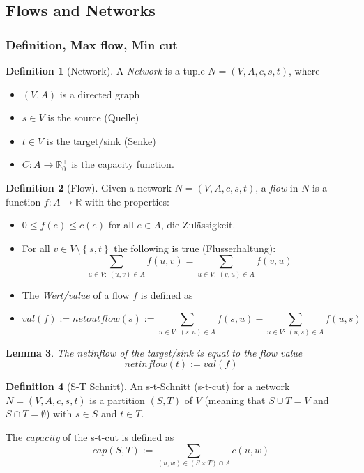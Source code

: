 \documentclass[12pt]{extarticle}
\theoremstyle{definition}
\newtheorem{definition}{Definition}[section]
\theoremstyle{remark}
\theoremstyle{plain}
\theoremstyle{plain}
\newtheorem{lemma}[definition]{Lemma}
\theoremstyle{plain}
\begin{document}
\subsection{Flows and Networks}


\subsubsection{Definition, Max flow, Min cut}
\begin{definition}[Network]
    A \textit{Network} is a tuple $N = (V, A, c, s, t)$, where
    \begin{itemize}
        \item $(V, A)$ is a directed graph
        \item $s \in V$ is the source (Quelle)
        \item $t \in V$ is the target/sink (Senke)
        \item $C: A \to \mathbb{R}^+_0$ is the capacity function.
    \end{itemize}
\end{definition}

\begin{definition}[Flow]
    Given a network $N = (V, A, c, s, t)$, a \textit{flow} in $N$ is a function $f: A \to \mathbb{R}$ with the
    properties:
    \begin{itemize}
        \item $0 \le f(e) \le c(e)$ for all $e \in A$, die Zulässigkeit.
        \item For all $v \in V \setminus \left\{ s, t \right\}$ the following is true (Flusserhaltung):
              \[ \sum_{u \in V:\ (u, v) \in A} f(u, v) = \sum_{u \in V:\ (v, u) \in A} f(v, u) \]
        \item The \textit{Wert/value} of a flow $f$ is defined as
        \item \[ val(f) := netoutflow(s) := \sum_{u \in V:\ (s, u) \in A} f(s, u) - \sum_{u \in V:\ (u, s) \in A} f(u, s) \]
    \end{itemize}
\end{definition}

\begin{lemma}
    The netinflow of the target/sink is equal to the flow value
    \[ netinflow(t) := val(f) \]
\end{lemma}

\begin{definition}[S-T Schnitt]
    An s-t-Schnitt (s-t-cut) for a network $N = (V, A, c, s, t)$ is a partition $(S, T)$ of $V$ (meaning that
    $S \cup T = V$ and $S \cap T = \emptyset$) with $s \in S$ and $t \in T$.

    The \textit{capacity} of the s-t-cut is defined as
    \[ cap(S, T) := \sum_{(u, w) \in (S \times T) \cap A} c(u, w) \]
\end{definition}
\end{document}
